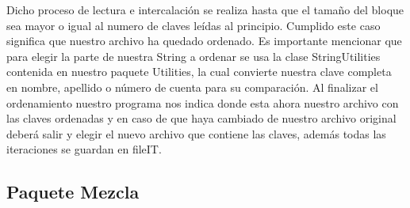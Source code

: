 \documentclass[11pt]{article}
\begin{document}
\par
Dicho proceso de lectura e intercalación se realiza hasta que el tamaño del bloque sea mayor o igual al numero de claves leídas al principio. Cumplido este caso significa que nuestro archivo ha quedado ordenado. Es importante mencionar que para elegir la parte de nuestra String a ordenar se usa la clase StringUtilities contenida en nuestro paquete Utilities, la cual convierte nuestra clave completa en nombre, apellido o número de cuenta para su comparación. Al finalizar el ordenamiento nuestro programa nos indica donde esta ahora nuestro archivo con las claves ordenadas y en caso de que haya cambiado de nuestro archivo original deberá salir y elegir el nuevo archivo que contiene las claves, además todas las iteraciones se guardan en fileIT.


\subsection{Paquete Mezcla}
\end{document}
